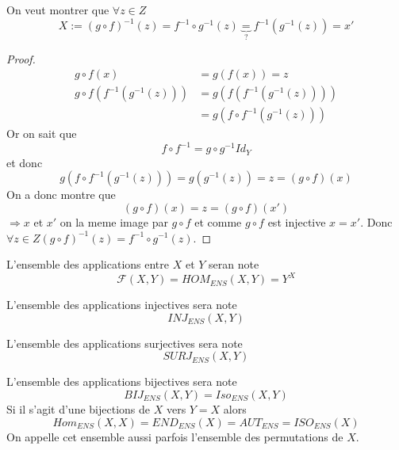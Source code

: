 \documentclass[../main.tex]{subfiles}
\begin{document}
\begin{propo}\label{propo:inverse_d_une_composition}
On veut montrer que $\forall z \in Z$ 
\[ 
	X := ( g\circ f)^{-1} ( z) = f^{-1} \circ g^{-1} ( z) \underbrace{=}_{?} f^{-1} ( g^{-1}(z)) = x'
\]

\end{propo}
\begin{proof}
\begin{align*}
	g \circ f ( x) &= g(f(x)) = z\\
	g\circ f( f^{-1}(g^{-1}(z))) &= g(f(f^{-1}(g^{-1}(z))))\\
				     &= g( f\circ f^{-1}(g^{-1}(z)))
\end{align*}
Or on sait que
\[ 
	f \circ f^{-1} = g \circ g^{-1} Id_{Y}
\]
et donc
\[ 
	g(f\circ f^{-1}(g^{-1}(z))) = g(g^{-1}(z)) =z = ( g \circ f)(x) 
\]
On a donc montre que
\[ 
	(g \circ f)(x) = z = ( g\circ f)(x')
\]
$\Rightarrow x$ et $x'$ on la meme image par $g\circ f $ et comme $g\circ f$ est injective $x=x'$.
Donc $\forall z \in Z (g\circ f)^{-1}(z) = f^{-1}\circ g^{-1}(z)$.

\end{proof}
L'ensemble des applications entre $X$ et $Y$ seran note
\[ 
	\mathcal{F} ( X,Y) = HOM_{ENS}(X,Y) = Y^{X}
\]
\begin{defn}\label{def:notations_injection}
L'ensemble des applications injectives sera note
\[ 
	INJ_{ENS}(X,Y)
\]

\end{defn}


\begin{defn}\label{def:notations_surjection}
L'ensemble des applications surjectives sera note
\[ 
	SURJ_{ENS}(X,Y)
\]

\end{defn}

\begin{defn}\label{def:notations_bijection}
L'ensemble des applications bijectives sera note
\[ 
	BIJ_{ENS}(X,Y) = Iso_{ENS}(X,Y)		
\]
Si il s'agit d'une bijections de $X$ vers $Y=X$ alors
\[ 
	Hom_{ENS}(X,X) = END_{ENS}(X) = AUT_{ENS} = ISO_{ENS}(X)
\]
On appelle cet ensemble aussi parfois l'ensemble des permutations de $X$.

\end{defn}
\end{document}
